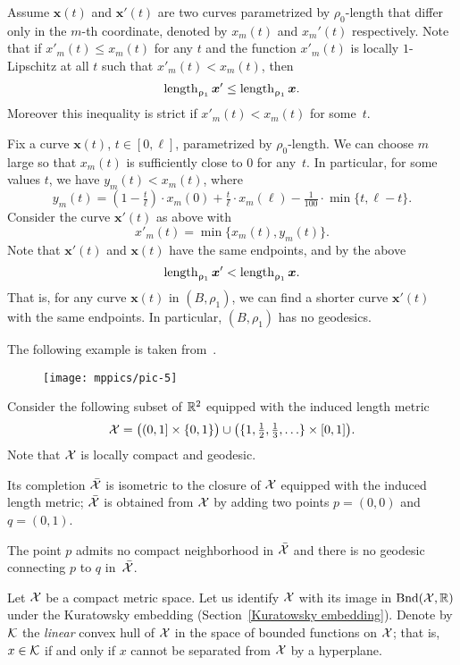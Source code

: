 Assume $\bm{x}(t)$ and $\bm{x}'(t)$ are two curves parametrized by $\rho_0$-length that differ only in the $m$-th coordinate, denoted by $x_m(t)$ and $x_m'(t)$ respectively.
Note that if $x'_m(t)\le x_m(t)$ for any $t$ and 
the function $x'_m(t)$ is locally $1$-Lipschitz at all $t$ such that $x'_m(t)< x_m(t)$, then 
\[\length_{\rho_1}\bm{x}'\le \length_{\rho_1}\bm{x}.\]
Moreover this inequality is strict if $x'_m(t)< x_m(t)$ for some~$t$.

Fix a curve $\bm{x}(t)$, $t\in[0,\ell]$, parametrized by  $\rho_0$-length.
We can choose $m$ large so that $x_m(t)$ is sufficiently close to $0$ for any~$t$.
In particular, for some values $t$, we have $y_m(t)<x_m(t)$, where
\[y_m(t)=(1-\tfrac t\ell)\cdot x_m(0)
+\tfrac t\ell\cdot x_m(\ell)
-\tfrac 1{100}\cdot \min\{t,\ell-t\}.\]
Consider the curve $\bm{x}'(t)$ as above with
\[x'_m(t)=\min\{x_m(t),y_m(t)\}.\]
Note that $\bm{x}'(t)$ and $\bm{x}(t)$ have the same endpoints, and by the above
\[\mathop{\rm length}\nolimits_{\upvarrho_1}\bm{x}'<\mathop{\rm length}\nolimits_{\upvarrho_1}\bm{x}.\]
That is, for any curve $\bm{x}(t)$ in $(B,\rho_1)$, we can find a shorter curve $\bm{x}'(t)$ with the same endpoints.
In particular, $(B,\rho_1)$ has no geodesics.

The following example is taken from~\cite{bridson-haefliger}.

\medskip

\begin{wrapfigure}{r}{20 mm}
\vskip-0mm
\centering
\texttt{[image: mppics/pic-5]}
\end{wrapfigure}

Consider the following subset of $\mathbb{R}^2$ equipped with the induced length metric
\[
\spc{X}
=
\bigl((0,1]\times\{0,1\}\bigr)
\cup
\bigl(\{1,\tfrac12,\tfrac13,\dots\}\times[0,1]\bigr).
\]
Note that $\mathcal{X}$ is locally compact and geodesic.

Its completion $\bar{\mathcal{X}}$ is isometric to the closure of $\mathcal{X}$ equipped with the induced length metric;
$\bar{\mathcal{X}}$ is obtained from $\mathcal{X}$ by adding two points $p=(0,0)$ and $q=(0,1)$.

The point $p$ admits no compact neighborhood in $\bar{\mathcal{X}}$ 
and there is no geodesic connecting $p$ to $q$ in~$\bar{\mathcal{X}}$. \qeds 

\parbf{\ref{ex:compact-in-lenght}}
Let $\mathcal{X}$ be a compact metric space.
Let us identify $\mathcal{X}$ with its image in $\mathrm{Bnd}(\mathcal{X},\mathbb{R})$ under the Kuratowsky embedding (Section~\ref{Kuratowsky embedding}). 
Denote by $\mathcal{K}$ the \emph{linear} convex hull of $\mathcal{X}$ in the space of bounded functions on $\mathcal{X}$; 
that is, $x\in \spc{K}$ if and only if $x$ cannot be separated from $\mathcal{X}$ by a hyperplane.

